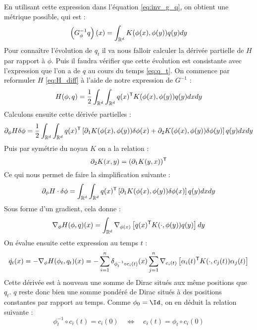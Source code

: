 En utilisant cette expression dans l'équation \eqref{eq:inv_g_q}, on obtient une métrique possible, qui est :
\begin{equation}
	\left( G_\phi^{-1} q \right)(x) = \int_{\mathbb{R}^d} K(\phi(x), \phi(y)) q(y) dy
\end{equation}
Pour connaître l'évolution de $q_t$ il va nous falloir calculer la dérivée partielle de $H$ par rapport à $\phi$. Puis il faudra vérifier que cette évolution est consistante avec l'expression que l'on a de $q$ au cours du temps \eqref{eq:q_t}. On commence par reformuler $H$ \eqref{eq:H_diff} à l'aide de notre expression de $G^{-1}$ :
\begin{equation}
	H(\phi, q) = \frac{1}{2} \int_{\mathbb{R}^d} \int_{\mathbb{R}^d} q(x)^{\mathsf{T}} K(\phi(x), \phi(y)) q(y) dx dy
\end{equation}
Calculons ensuite cette dérivée partielles :
\begin{equation}
	\partial_\phi H \delta \phi = \frac{1}{2} \int_{\mathbb{R}^d} \int_{\mathbb{R}^d} q(x)^{\mathsf{T}} \left[ \partial_1 K(\phi(x), \phi(y)) \delta \phi(x) + \partial_2 K(\phi(x), \phi(y)) \delta \phi(y) \right] q(y) dx dy
\end{equation}
Puis par symétrie du noyau $K$ on a la relation :
\begin{equation}
	\partial_2 K(x, y) = (\partial_1 K(y, x))^{\mathsf{T}}
\end{equation}
Ce qui nous permet de faire la simplification suivante :
\begin{equation}
	\partial_\phi H \cdot \delta \phi = \int_{\mathbb{R}^d} \int_{\mathbb{R}^d} q(x)^{\mathsf{T}} \left[ \partial_1 K(\phi(x), \phi(y)) \delta \phi(x) \right] q(y) dx dy
\end{equation}
Sous forme d'un gradient, cela donne :
\begin{equation}
	\nabla_\phi H(\phi, q)(x) = \int_{\mathbb{R}^d} \nabla_{\phi(x)} \left[ q(x)^{\mathsf{T}} K(\cdot, \phi(y)) q(y) \right] dy
\end{equation}
On évalue ensuite cette expression au temps $t$ :
\begin{equation}
	\dot{q_t}(x) = - \nabla_\phi H(\phi_t, q_t) (x) = - \sum_{i=1}^n \delta_{\phi_t^{-1} \circ c_i(t)}(x) \sum_{j=1}^n \nabla_{c_i(t)} \left[ \alpha_i(t)^{\mathsf{T}} K(\cdot, c_j(t)) \alpha_j(t) \right]
\end{equation}
Cette dérivée est à nouveau une somme de Dirac situés aux même positions que $q_t$. $q$ reste donc bien une somme pondéré de Dirac situés à des positions constantes par rapport au temps. Comme $\phi_0 = \Id$, on en déduit la relation suivante :
\begin{equation}
	\label{eq:c_cons}
	\phi_t^{-1} \circ c_i(t) = c_i(0) \quad \Leftrightarrow \quad c_i(t) = \phi_t \circ c_i(0)
\end{equation}
